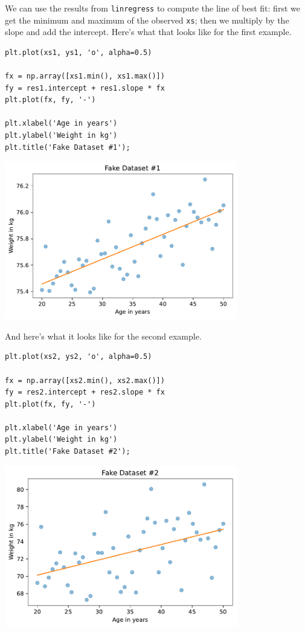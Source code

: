 We can use the results from \passthrough{\lstinline!linregress!} to
compute the line of best fit: first we get the minimum and maximum of
the observed \passthrough{\lstinline!xs!}; then we multiply by the slope
and add the intercept. Here's what that looks like for the first
example.

\begin{lstlisting}[]
plt.plot(xs1, ys1, 'o', alpha=0.5)

fx = np.array([xs1.min(), xs1.max()])
fy = res1.intercept + res1.slope * fx
plt.plot(fx, fy, '-')

plt.xlabel('Age in years')
plt.ylabel('Weight in kg')
plt.title('Fake Dataset #1');
\end{lstlisting}

\begin{center}
\includegraphics[width=4in]{chapters/09_relationships_files/09_relationships_87_0.pdf}
\end{center}

And here's what it looks like for the second example.

\begin{lstlisting}[]
plt.plot(xs2, ys2, 'o', alpha=0.5)

fx = np.array([xs2.min(), xs2.max()])
fy = res2.intercept + res2.slope * fx
plt.plot(fx, fy, '-')

plt.xlabel('Age in years')
plt.ylabel('Weight in kg')
plt.title('Fake Dataset #2');
\end{lstlisting}

\begin{center}
\includegraphics[width=4in]{chapters/09_relationships_files/09_relationships_89_0.pdf}
\end{center}

